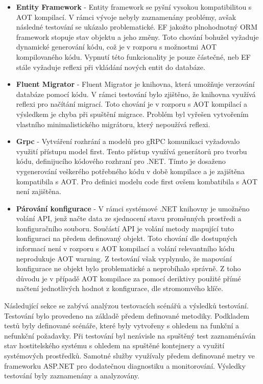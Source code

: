\begin{itemize}
  \item \textbf{Entity Framework} - Entity framework se pyšní vysokou kompatibilitou s AOT kompilací. V rámci vývoje nebyly zaznamenány problémy, avšak následné testování se ukázalo problematické. EF jakožto plnohodnotný ORM framework stopuje stav objektu a jeho změny. Toto chování bohužel vyžaduje dynamické generování kódu, což je v rozporu s možnostmi AOT kompilovaného kódu. Vypnutí této funkcionality je pouze částečné, neb EF stále vyžaduje reflexi při vkládání nových entit do databáze.
  \item \textbf{Fluent Migrator} - Fluent Migrator je knihovna, která umožňuje verzování databáze pomocí kódu. V rámci testování bylo zjištěno, že knihovna využívá reflexi pro načítání migrací. Toto chování je v rozporu s AOT kompilací a výsledkem je chyba při spuštění migrace. Problém byl vyřešen vytvořením vlastního minimalistického migrátoru, který nepoužívá reflexi.
  \item \textbf{Grpc} - Vytváření rozhrání a modelů pro gRPC komunikaci vyžadovalo využití přístupu model first. Tento přístup využívá generátorů pro tvorbu kódu, definijucího kódového rozhraní pro .NET. Tímto je dosaženo vygenerování veškerého potřebného kódu v době kompilace a je zajištěna kompatibila s AOT. Pro definici modelu code first ovšem kombatibila s AOT není zajištěna.
  \item \textbf{Párování konfigurace} - V rámci systémové .NET knihovny je umožněno volání API, jenž načte data ze sjednocení stavu proměnných prostředi a konfiguračního souboru. Součástí API je volání metody mapující tuto konfiguraci na předem definovaný objekt. Toto chování dle dostupných informací není v rozporu s AOT kompilací a volání relevantního kódu neprodukuje AOT warning. Z testování však vyplynulo, že mapování konfigurace ne objekt bylo problematické a neprobíhalo správně. Z toho důvodu je v případě AOT kompilace za pomocí deriktivy použité přímé načtení jednotlivých hodnot z konfigurace, dle stromomvého klíče.
\end{itemize}


Následující sekce se zabývá analýzou testovacích scénářů a výsledků testování. Testování bylo provedeno na základě předem definované metodiky. Podkladem testů byly definované scénáře, které byly vytvořeny s ohledem na funkční a nefunkční požadavky. Při testování byl nezávisle na spuštěný test zaznaménáván stav hostitelského systému s ohledem na spuštěné kontejnery a využití systémových prostředků. Samotné služby využívaly předem definované metry ve frameworku ASP.NET pro dodatečnou diagnostiku a monitorování. Výsledky testování byly zaznamenány a analyzovány.

